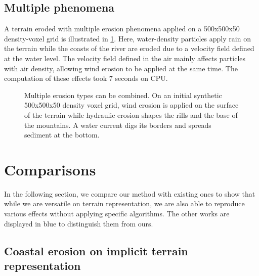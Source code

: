 \subsection{Multiple phenomena} 

A terrain eroded with multiple erosion phenomena applied on a 500x500x50 density-voxel grid is illustrated in \cref{fig:erosion-multiErosions}. Here, water-density particles apply rain on the terrain while the coasts of the river are eroded due to a velocity field defined at the water level. The velocity field defined in the air mainly affects particles with air density, allowing wind erosion to be applied at the same time. The computation of these effects took 7 seconds on CPU.

\begin{figure}
    \caption{Multiple erosion types can be combined. On an initial synthetic 500x500x50 density voxel grid, wind erosion is applied on the surface of the terrain while hydraulic erosion shapes the rills and the base of the mountains. A water current digs its borders and spreads sediment at the bottom.}
    \label{fig:erosion-multiErosions}
\end{figure}

\section{Comparisons}

In the following section, we compare our method with existing ones to show that while we are versatile on terrain representation, we are also able to reproduce various effects without applying specific algorithms. The other works are displayed in blue to distinguish them from ours.

\subsection{Coastal erosion on implicit terrain representation}

